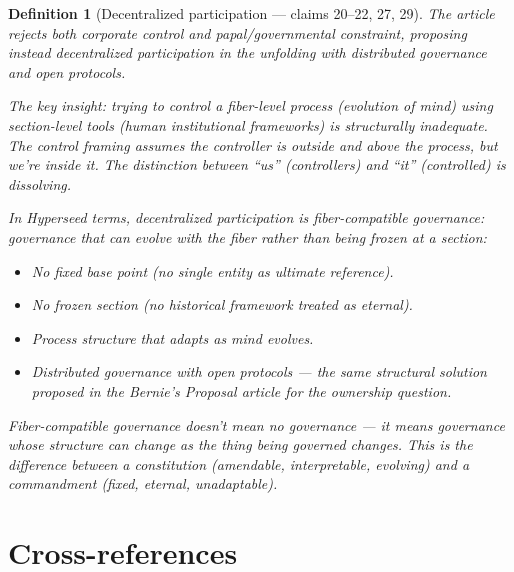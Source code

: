 \documentclass[11pt,a4paper]{article}
\newtheorem{definition}{Definition}[section]
\begin{document}
\begin{definition}[Decentralized participation --- claims 20--22, 27, 29]
\label{def:governance}
The article rejects both corporate control and papal/governmental
constraint, proposing instead decentralized participation in the
unfolding with distributed governance and open protocols.

The key insight: trying to control a fiber-level process (evolution
of mind) using section-level tools (human institutional frameworks)
is \emph{structurally inadequate}. The control framing assumes the
controller is outside and above the process, but we're inside it.
The distinction between ``us'' (controllers) and ``it'' (controlled)
is dissolving.

In Hyperseed terms, decentralized participation is
\emph{fiber-compatible governance}: governance that can evolve
with the fiber rather than being frozen at a section:
\begin{itemize}
\item No fixed base point (no single entity as ultimate reference).
\item No frozen section (no historical framework treated as eternal).
\item Process structure that adapts as mind evolves.
\item Distributed governance with open protocols --- the same
  structural solution proposed in the Bernie's Proposal article
  for the ownership question.
\end{itemize}

Fiber-compatible governance doesn't mean no governance --- it means
governance whose structure can change as the thing being governed
changes. This is the difference between a constitution (amendable,
interpretable, evolving) and a commandment (fixed, eternal,
unadaptable).
\end{definition}

\section{Cross-references}
\end{document}
